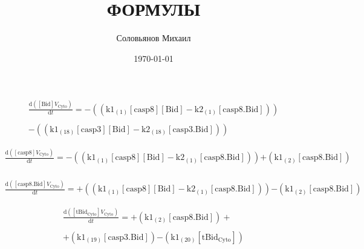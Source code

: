 \documentclass[a4paper,12pt]{article} %
\author{Соловьянов Михаил }
\title{ФОРМУЛЫ}
\date{\today}
\newcommand{\M}[1]{\mathrm{#1}}
\begin{document}








\begin{equation}
\begin{split}
\frac {\M{d}( {{\M{[Bid]}}    {V}_{\M{Cyto}} } ) }  {\M{d}{t} }  =  {  -  (( {{\M{k1}}_{\M{(1)}}    {\M{[casp8]}}    {\M{[Bid]}}  -  {\M{k2}}_{\M{(1)}}    {\M{[casp8.Bid]}} } )) } \\ 
  \\ 
   {  -  (( {{\M{k1}}_{\M{(18)}}    {\M{[casp3]}}    {\M{[Bid]}}  -  {\M{k2}}_{\M{(18)}}    {\M{[casp3.Bid]}} } )) } 
\end{split}
\end{equation}


\begin{equation}
\begin{split}
\frac {\M{d}( {{\M{[casp8]}}    {V}_{\M{Cyto}} } ) }  {\M{d}{t} }  =  {  -  (( {{\M{k1}}_{\M{(1)}}    {\M{[casp8]}}    {\M{[Bid]}}  -  {\M{k2}}_{\M{(1)}}    {\M{[casp8.Bid]}} } )) } 
   {  +  ( {{\M{k1}}_{\M{(2)}}    {\M{[casp8.Bid]}} } ) } \\  
\end{split}
\end{equation}

\begin{equation}
\begin{split}
\frac {\M{d}( {{\M{[casp8.Bid]}}    {V}_{\M{Cyto}} } ) }  {\M{d}{t} }  =  {  +  (( {{\M{k1}}_{\M{(1)}}    {\M{[casp8]}}    {\M{[Bid]}}  -  {\M{k2}}_{\M{(1)}}    {\M{[casp8.Bid]}} } )) } 
   {  -  ( {{\M{k1}}_{\M{(2)}}    {\M{[casp8.Bid]}} } ) } 
\end{split}
\end{equation}


\begin{equation}
\begin{split}
\frac {\M{d}( {{\M{[tBid_{Cyto}]}}    {V}_{\M{Cyto}} } ) }  {\M{d}{t} }  =  {  +  ( {{\M{k1}}_{\M{(2)}}    {\M{[casp8.Bid]}} } ) } + \\ 
  \\ 
   {  +  ( {{\M{k1}}_{\M{(19)}}    {\M{[casp3.Bid]}} } ) } 
   {  -  ( {{\M{k1}}_{\M{(20)}}    {\M{[tBid_{Cyto}]}} } ) } 
\end{split}
\end{equation}
\end{document}
